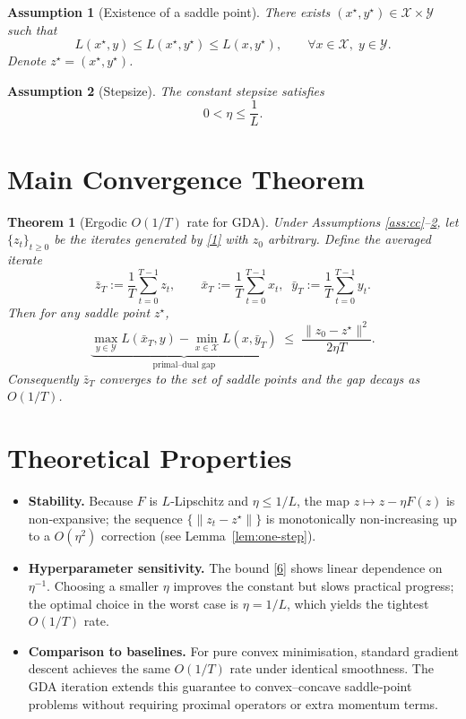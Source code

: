\documentclass{article}
\newtheorem{theorem}{Theorem}
\newtheorem{assumption}{Assumption}
\begin{document}
\begin{assumption}[Existence of a saddle point]\label{ass:saddle}
There exists $(x^{\star},y^{\star})\in\mathcal X\times\mathcal Y$ such that
\[
L(x^{\star},y)\le L(x^{\star},y^{\star})\le L(x,y^{\star}),\qquad\forall x\in\mathcal X,\;y\in\mathcal Y .
\tag{4}
\]
Denote $z^{\star}=(x^{\star},y^{\star})$.
\end{assumption}

\begin{assumption}[Stepsize]\label{ass:stepsize}
The constant stepsize satisfies
\[
0<\eta\le\frac{1}{L}.
\tag{5}
\]
\end{assumption}

\section*{Main Convergence Theorem}
\begin{theorem}[Ergodic $O(1/T)$ rate for GDA]\label{thm:main}
Under Assumptions \ref{ass:cc}–\ref{ass:stepsize}, let $\{z_{t}\}_{t\ge0}$ be the iterates generated by
\eqref{1} with $z_{0}$ arbitrary. Define the averaged iterate
\[
\bar z_{T}:=\frac{1}{T}\sum_{t=0}^{T-1}z_{t},
\qquad
\bar x_{T}:=\frac{1}{T}\sum_{t=0}^{T-1}x_{t},
\;\;
\bar y_{T}:=\frac{1}{T}\sum_{t=0}^{T-1}y_{t}.
\]
Then for any saddle point $z^{\star}$,
\[
\underbrace{\max_{y\in\mathcal Y}L(\bar x_{T},y)-\min_{x\in\mathcal X}L(x,\bar y_{T})}_{\text{primal–dual gap}}
\;\le\;
\frac{\|z_{0}-z^{\star}\|^{2}}{2\eta T}.
\tag{6}
\]
Consequently $\bar z_{T}$ converges to the set of saddle points and the gap decays as $O(1/T)$.
\end{theorem}

\section*{Theoretical Properties}
\begin{itemize}
\item \textbf{Stability.} Because $F$ is $L$‑Lipschitz and $\eta\le1/L$, the map $z\mapsto z-\eta F(z)$ is
non‑expansive; the sequence $\{\|z_{t}-z^{\star}\|\}$ is monotonically non‑increasing up to a
$O(\eta^{2})$ correction (see Lemma~\ref{lem:one-step}).
\item \textbf{Hyperparameter sensitivity.} The bound \eqref{6} shows linear dependence on $\eta^{-1}$. Choosing a
smaller $\eta$ improves the constant but slows practical progress; the optimal
choice in the worst case is $\eta=1/L$, which yields the tightest $O(1/T)$ rate.
\item \textbf{Comparison to baselines.} For pure convex minimisation, standard gradient descent
achieves the same $O(1/T)$ rate under identical smoothness. The GDA iteration
extends this guarantee to convex–concave saddle‑point problems without requiring
proximal operators or extra momentum terms.
\end{itemize}
\end{document}
